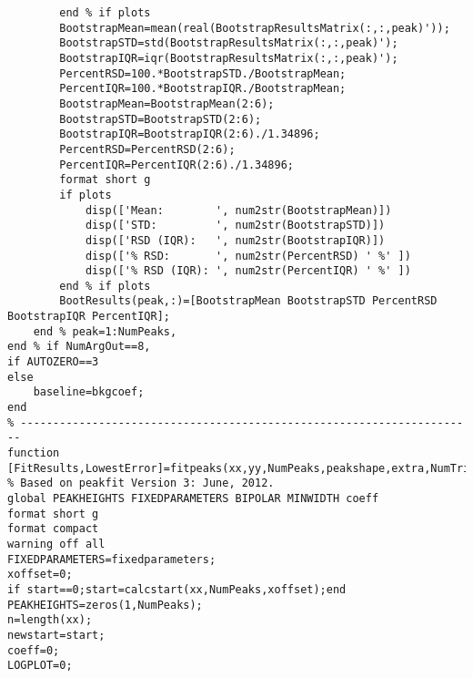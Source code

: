 \begin{lstlisting}
        end % if plots
        BootstrapMean=mean(real(BootstrapResultsMatrix(:,:,peak)'));
        BootstrapSTD=std(BootstrapResultsMatrix(:,:,peak)');
        BootstrapIQR=iqr(BootstrapResultsMatrix(:,:,peak)');
        PercentRSD=100.*BootstrapSTD./BootstrapMean;
        PercentIQR=100.*BootstrapIQR./BootstrapMean;
        BootstrapMean=BootstrapMean(2:6);
        BootstrapSTD=BootstrapSTD(2:6);
        BootstrapIQR=BootstrapIQR(2:6)./1.34896;
        PercentRSD=PercentRSD(2:6);
        PercentIQR=PercentIQR(2:6)./1.34896;
        format short g
        if plots
            disp(['Mean:        ', num2str(BootstrapMean)])
            disp(['STD:         ', num2str(BootstrapSTD)])
            disp(['RSD (IQR):   ', num2str(BootstrapIQR)])
            disp(['% RSD:       ', num2str(PercentRSD) ' %' ])
            disp(['% RSD (IQR): ', num2str(PercentIQR) ' %' ])
        end % if plots
        BootResults(peak,:)=[BootstrapMean BootstrapSTD PercentRSD BootstrapIQR PercentIQR];
    end % peak=1:NumPeaks,
end % if NumArgOut==8,
if AUTOZERO==3
else
    baseline=bkgcoef;
end
% ----------------------------------------------------------------------
function [FitResults,LowestError]=fitpeaks(xx,yy,NumPeaks,peakshape,extra,NumTrials,start,AUTOZERO,fixedparameters,shapesvector)
% Based on peakfit Version 3: June, 2012. 
global PEAKHEIGHTS FIXEDPARAMETERS BIPOLAR MINWIDTH coeff
format short g
format compact
warning off all
FIXEDPARAMETERS=fixedparameters;
xoffset=0;
if start==0;start=calcstart(xx,NumPeaks,xoffset);end
PEAKHEIGHTS=zeros(1,NumPeaks);
n=length(xx);
newstart=start;
coeff=0;
LOGPLOT=0;


\end{lstlisting}
